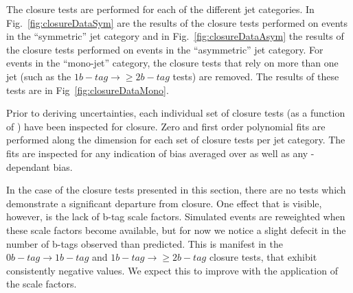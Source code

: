 The closure tests are performed for each of the different jet
categories. In Fig.~\ref{fig:closureDataSym} are the results of the
closure tests performed on events in the ``symmetric'' jet category
and in Fig.~\ref{fig:closureDataAsym} the results of the closure tests
performed on events in the ``asymmetric'' jet
category. For events in the ``mono-jet'' category, the closure tests
that rely on more than one jet (such as the $1 b-tag\rightarrow\geq 2
b-tag$ tests) are removed. The results of these tests are in
Fig~\ref{fig:closureDataMono}.

Prior to deriving uncertainties, each individual set of closure tests
(as a function of \scalht) have been inspected for closure. Zero and first order
polynomial fits are performed along the \scalht dimension for each set
of closure tests per jet category. The fits are inspected for any
indication of bias averaged over \scalht as well as any
\scalht-dependant bias.

In the case of the closure tests presented in this section, there are
no tests which demonstrate a significant departure from closure. One
effect that is visible, however, is the lack of b-tag scale factors.
Simulated events are reweighted when these scale factors become
available, but for now we notice a slight defecit in the number of
b-tags observed than predicted. This is manifest in the $0 b-tag
\rightarrow 1 b-tag$ and $1 b-tag \rightarrow \geq 2 b-tag$ closure
tests, that exhibit consistently negative values. We expect this to
improve with the application of the scale factors. 

